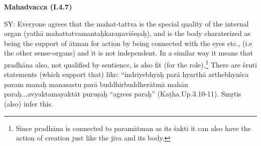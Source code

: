 \newpage









\textbf{Mahadvacca (I.4.7)}

SY: Everyone agrees that the mahat-tattva is the special quality of the internal organ (yathā mahattatvamantaḥkaraṇaviśeṣaḥ),  and is the body charaterized as being the support of ātman for action by being connected with the eyes etc., (i.e the other sense-organs)  and it is not independent. In a similar way it means that pradhāna also, not qualified by sentience, is also fit (for the role).\footnote{Since pradhāna is connected to paramātman as its śakti it can also have the action of creation just like the jīva and its body.} There are śruti statements (which support that) like: “indriyebhyaḥ parā hyarthā arthebhyaśca param manaḥ manasastu parā buddhirbuddherātmā mahān paraḥ...avyaktamayaktāt puruṣaḥ ``agrees paraḥ” (Kaṭha.Up.3.10-11).  Smṛtis (also) infer this.

